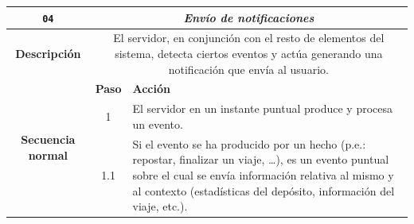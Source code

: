 \begin{table}[H]
  \centering
  \begin{tabularx}{\textwidth}{|c|c|X|}
    \hline
    \texttt{04}                                 & \multicolumn{2}{c|}{\textit{Envío de notificaciones}}                                                                                                                                                                                                                                                                                                                                                                                   \\
    \hline
    \textbf{Descripción}                        & \multicolumn{2}{X|}{El servidor, en conjunción con el resto de elementos del sistema, detecta ciertos eventos y actúa generando una notificación que envía al usuario.}                                                                                                                                                                                                                                                                 \\
    \hline
    \multirow{18}{*}{\textbf{Secuencia normal}} & \textbf{Paso}                                                                                                                                                           & \textbf{Acción}                                                                                                                                                                                                                                               \\
    \cline{2-3}
                                                & 1                                                                                                                                                                       & \multicolumn{1}{L|}{El servidor en un instante puntual produce y procesa un evento.}                                                                                                                                                                          \\
    \cline{2-3}
                                                & 1.1                                                                                                                                                                     & \multicolumn{1}{L|}{Si el evento se ha producido por un hecho (p.e.: repostar, finalizar un viaje, \dots), es un evento puntual sobre el cual se envía información relativa al mismo y al contexto (estadísticas del depósito, información del viaje, etc.).} \\

\end{tabularx}
\end{table}
